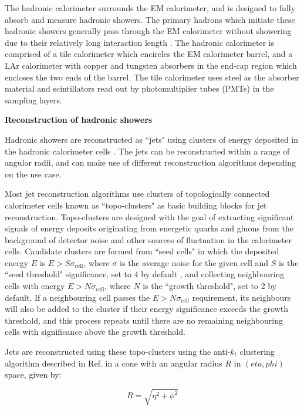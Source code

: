 The hadronic calorimeter surrounds the EM calorimeter, and is designed to fully absorb and measure hadronic showers. The primary hadrons which initiate these hadronic showers generally pass through the EM calorimeter without showering due to their relatively long interaction length \cite{atlas}. The hadronic calorimeter is comprised of a tile calorimeter which encircles the EM calorimeter barrel, and a LAr calorimeter with copper and tungsten absorbers in the end-cap region which encloses the two ends of the barrel. The tile calorimeter uses steel as the absorber material and scintillators read out by photomultiplier tubes (PMTs) in the sampling layers. 

\textbf{Reconstruction of hadronic showers}

Hadronic showers are reconstructed as ``jets" using clusters of energy deposited in the hadronic calorimeter cells \cite{jet_reco}. The jets can be reconstructed within a range of angular radii, and can make use of different reconstruction algorithms depending on the use case. 

Most jet reconstruction algorithms use clusters of topologically connected calorimeter cells known as ``topo-clusters" as basic building blocks for jet reconstruction. Topo-clusters are designed with the goal of extracting significant signals of energy deposits originating from energetic quarks and gluons from the background of detector noise and other sources of fluctuation in the calorimeter cells. Candidate clusters are formed from ``seed cells" in which the deposited energy $E$ is $E>S\sigma_\text{cell}$, where $\sigma$ is the average noise for the given cell and $S$ is the ``seed threshold" significance, set to 4 by default \cite{topo_cell_clustering}, and collecting neighbouring cells with energy $E>N\sigma_\text{cell}$, where $N$ is the ``growth threshold", set to 2 by default. If a neighbouring cell passes the $E>N\sigma_\text{cell}$ requirement, its neighbours will also be added to the cluster if their energy significance exceeds the growth threshold, and this process repeats until there are no remaining neighbouring cells with significance above the growth threshold. 

Jets are reconstructed using these topo-clusters using the anti-$k_t$ clustering algorithm described in Ref. \cite{akt_algo} in a cone with an angular radius $R$ in $(eta, phi)$ space, given by:

\begin{equation}
\label{eq:jet_radius}
R = \sqrt{\eta^2 + \phi^2}
\end{equation}

